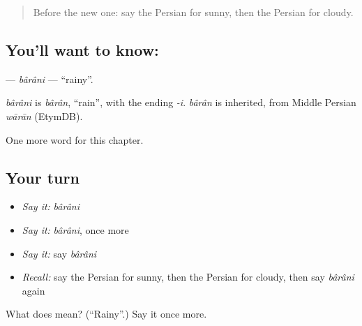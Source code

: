 \label{lesson:FA-C201-barani}



\begin{quote}
Before the new one: say the Persian for sunny, then the Persian for cloudy.
\end{quote}

\subsection*{You'll want to know: }
\textbf{} — \emph{bârâni} — \textquotedblleft{}rainy\textquotedblright{}.

\begin{cousinweb}
\emph{bârâni} is \emph{bârân}, \textquotedblleft{}rain\textquotedblright{}, with the ending \emph{-i}. \emph{bârân} is inherited, from Middle Persian \emph{wārān} (EtymDB).
\end{cousinweb}

\begin{grammarlens}[title={What you've built}]
One more word for this chapter.
\end{grammarlens}

\subsection*{Your turn}
\begin{itemize}
\raggedright
  \item \emph{Say it:} \emph{bârâni}
  \item \emph{Say it:} \emph{bârâni}, once more
  \item \emph{Say it:} say \emph{bârâni}
  \item \emph{Recall:} say the Persian for sunny, then the Persian for cloudy, then say \emph{bârâni} again
\end{itemize}

\begin{tcolorbox}[breakable,colback=teal!4,colframe=teal!35!black,title={Before you move on}]
What does  mean? (\textquotedblleft{}Rainy\textquotedblright{}.) Say it once more.
\end{tcolorbox}
